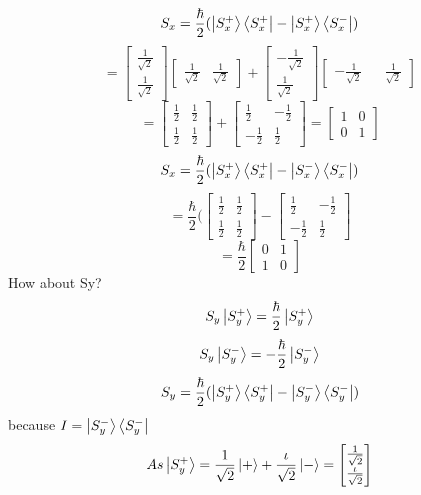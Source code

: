 \documentclass{book}
\begin{document}
$$S_x = \frac{\hbar}{2} ( \ket{S_x^+} \bra{S_x^+} - \ket{S_x^+} \bra{S_x^-})$$
$$ = \begin{bmatrix}
 \frac{1}{\sqrt{2}} \\ \frac{1}{\sqrt{2}} 
\end{bmatrix}
\begin{bmatrix}
 \frac{1}{\sqrt{2}} & \frac{1}{\sqrt{2}} 
\end{bmatrix} + 
\begin{bmatrix}
 - \frac{1}{\sqrt{2}}  \\ \frac{1}{\sqrt{2}} 
\end{bmatrix}
\begin{bmatrix}
  - \frac{1}{\sqrt{2}} && \frac{1}{\sqrt{2}} 
\end{bmatrix}
$$
$$
= \begin{bmatrix}
\frac{1}{2} & \frac{1}{2} \\
\frac{1}{2} & \frac{1}{2}
\end{bmatrix} + 
\begin{bmatrix}
 \frac{1}{2} & - \frac{1}{2} \\
 - \frac{1}{2} & \frac{1}{2}
\end{bmatrix} = 
\begin{bmatrix}
 1 & 0 \\
 0 & 1
\end{bmatrix}
$$
$$S_x = \frac{\hbar}{2}( \ket{S_x^+} \bra{S_x^+} - \ket{S_x^-} \bra{S_x^-})$$
$$= \frac{\hbar}{2} ( \begin{bmatrix}
 \frac{1}{2} & \frac{1}{2} \\
 \frac{1}{2} & \frac{1}{2}
\end{bmatrix} -
\begin{bmatrix}
 \frac{1}{2} & - \frac{1}{2} \\
 -\frac{1}{2} &  \frac{1}{2}
\end{bmatrix}$$
$$ = \frac{\hbar}{2} \begin{bmatrix}
 0 & 1 \\
 1 & 0
\end{bmatrix}$$
How about Sy?
$$S_y \ket{S_y^+} = \frac{\hbar}{2} \ket{S_y^+}$$
$$S_y \ket{S_y^-} = -\frac{\hbar}{2} \ket{S_y^-} $$
$$S_y = \frac{\hbar}{2}( \ket{S_y^+}\bra{S_y^+} - \ket{S_y^-}\bra{S_y^-})$$
because $ I = \ket{S_y^-} \bra{S_y^-}$
$$ As \ket	{S_y^+} = \frac{1}{\sqrt{2}}\ket{+} + \frac{\iota}{\sqrt{2}} \ket{-} = \begin{bmatrix}
 \frac{1}{\sqrt{2}} \\ \frac{\iota}{\sqrt{2}}
\end{bmatrix}$$
\end{document}
